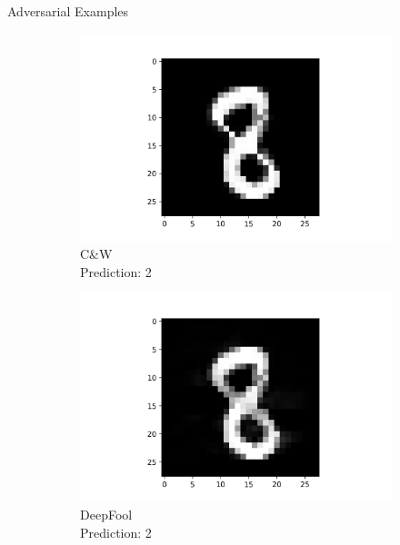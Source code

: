 \documentclass[9pt]{beamer}
\begin{document}
\begin{frame}{Adversarial Examples}
\begin{figure}
    \begin{subfigure}[t]{0.24\linewidth}
        \centering
        \captionsetup{justification=centering}
        \includegraphics[width=\linewidth]{images/CW_2.png}
        \caption{C\&W\\Prediction: 2}
    \end{subfigure}
    \begin{subfigure}[t]{0.24\linewidth}
        \centering
        \captionsetup{justification=centering}
        \captionsetup{justification=centering}
        \includegraphics[width=\linewidth]{images/DeepFool_2.png}
        \caption{DeepFool\\Prediction: 2}
    \end{subfigure}
    \begin{subfigure}[t]{0.24\linewidth}
        \centering
        \captionsetup{justification=centering}

\end{subfigure}
\end{figure}
\end{frame}
\end{document}
